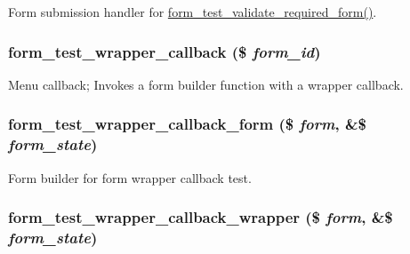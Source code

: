 \label{form__test_8module_aa70eaa6503e093b6744817fb5e1aa905}
Form submission handler for \hyperlink{form__test_8module_a19d7e573a59984582ba545d6a796fe2b}{form\_\-test\_\-validate\_\-required\_\-form()}. \hypertarget{form__test_8module_a9a193294926cee53f06ae8ab91371593}{
\subsubsection[{form\_\-test\_\-wrapper\_\-callback}]{\setlength{\rightskip}{0pt plus 5cm}form\_\-test\_\-wrapper\_\-callback (\$ {\em form\_\-id})}}
\label{form__test_8module_a9a193294926cee53f06ae8ab91371593}
Menu callback; Invokes a form builder function with a wrapper callback. \hypertarget{form__test_8module_ac8506013dd0135407072df7d9bccbc97}{
\subsubsection[{form\_\-test\_\-wrapper\_\-callback\_\-form}]{\setlength{\rightskip}{0pt plus 5cm}form\_\-test\_\-wrapper\_\-callback\_\-form (\$ {\em form}, \/  \&\$ {\em form\_\-state})}}
\label{form__test_8module_ac8506013dd0135407072df7d9bccbc97}
Form builder for form wrapper callback test. \hypertarget{form__test_8module_a5f620025f655631e2d335ac02da61c27}{
\subsubsection[{form\_\-test\_\-wrapper\_\-callback\_\-wrapper}]{\setlength{\rightskip}{0pt plus 5cm}form\_\-test\_\-wrapper\_\-callback\_\-wrapper (\$ {\em form}, \/  \&\$ {\em form\_\-state})}}
\label{form__test_8module_a5f620025f655631e2d335ac02da61c27}
